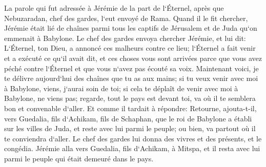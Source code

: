 \verse La parole qui fut adressée à Jérémie de la part de l`Éternel, après que Nebuzaradan, chef des gardes, l`eut envoyé de Rama. Quand il le fit chercher, Jérémie était lié de chaînes parmi tous les captifs de Jérusalem et de Juda qu`on emmenait à Babylone. 
\verse Le chef des gardes envoya chercher Jérémie, et lui dit: L`Éternel, ton Dieu, a annoncé ces malheurs contre ce lieu; 
\verse l`Éternel a fait venir et a exécuté ce qu`il avait dit, et ces choses vous sont arrivées parce que vous avez péché contre l`Éternel et que vous n`avez pas écouté sa voix. 
\verse Maintenant voici, je te délivre aujourd`hui des chaînes que tu as aux mains; si tu veux venir avec moi à Babylone, viens, j`aurai soin de toi; si cela te déplaît de venir avec moi à Babylone, ne viens pas; regarde, tout le pays est devant toi, va où il te semblera bon et convenable d`aller. 
\verse Et comme il tardait à répondre: Retourne, ajouta-t-il, vers Guedalia, fils d`Achikam, fils de Schaphan, que le roi de Babylone a établi sur les villes de Juda, et reste avec lui parmi le peuple; ou bien, va partout où il te conviendra d`aller. Le chef des gardes lui donna des vivres et des présents, et le congédia. 
\verse Jérémie alla vers Guedalia, fils d`Achikam, à Mitspa, et il resta avec lui parmi le peuple qui était demeuré dans le pays. 
